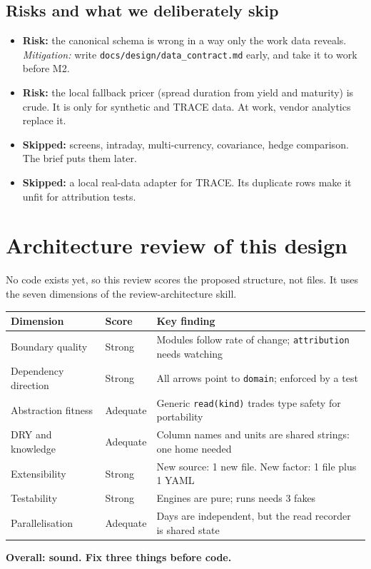 \documentclass[11pt,a4paper]{article}
\newcommand{\code}[1]{\texttt{\small #1}}
\begin{document}
\subsection{Risks and what we deliberately skip}
\begin{itemize}
\item \textbf{Risk:} the canonical schema is wrong in a way only the work data reveals. \emph{Mitigation:} write \code{docs/design/data\_contract.md} early, and take it to work before M2.
\item \textbf{Risk:} the local fallback pricer (spread duration from yield and maturity) is crude. It is only for synthetic and TRACE data. At work, vendor analytics replace it.
\item \textbf{Skipped:} screens, intraday, multi-currency, covariance, hedge comparison. The brief puts them later.
\item \textbf{Skipped:} a local real-data adapter for TRACE. Its duplicate rows make it unfit for attribution tests.
\end{itemize}

\section{Architecture review of this design}\label{sec:review}
No code exists yet, so this review scores the proposed structure, not files. It uses the seven dimensions of the review-architecture skill.

\begin{center}\small
\begin{tabularx}{\linewidth}{@{}llX@{}}\toprule
Dimension & Score & Key finding \\\midrule
Boundary quality & \color{good}Strong & Modules follow rate of change; \code{attribution} needs watching \\
Dependency direction & \color{good}Strong & All arrows point to \code{domain}; enforced by a test \\
Abstraction fitness & \color{warn}Adequate & Generic \code{read(kind)} trades type safety for portability \\
DRY and knowledge & \color{warn}Adequate & Column names and units are shared strings: one home needed \\
Extensibility & \color{good}Strong & New source: 1 new file. New factor: 1 file plus 1 YAML \\
Testability & \color{good}Strong & Engines are pure; runs needs 3 fakes \\
Parallelisation & \color{warn}Adequate & Days are independent, but the read recorder is shared state \\\bottomrule
\end{tabularx}
\end{center}
\textbf{Overall: \color{good}sound\color{black}. Fix three things before code.}
\end{document}
